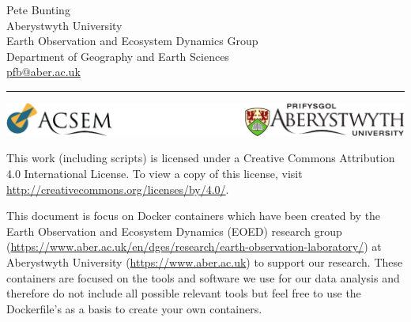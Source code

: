\documentclass[authoryear, 11pt, oneside]{report}
\newcommand{\HRule}[1]{\hfill \rule{0.2\linewidth}{#1}} %
\begin{document}
\vfill %


{\centering \large 
\hfill Pete Bunting \\
\hfill Aberystwyth University \\
\hfill Earth Observation and Ecosystem Dynamics Group \\
\hfill Department of Geography and Earth Sciences \\
\hfill \url{pfb@aber.ac.uk} \\

\HRule{1pt}} %


\begin{center}
	\includegraphics[width=\columnwidth]{./figures/Logos.pdf}
\end{center}

\clearpage %





\begin{framed}
This work (including scripts) is licensed under a Creative Commons Attribution 4.0 International License. To view a copy of this license, visit \url{http://creativecommons.org/licenses/by/4.0/}. 
\end{framed}

\begin{framed}
This document is focus on Docker containers which have been created by the Earth Observation and Ecosystem Dynamics (EOED) research group (\url{https://www.aber.ac.uk/en/dges/research/earth-observation-laboratory/}) at Aberystwyth University (\url{https://www.aber.ac.uk}) to support our research. These containers are focused on the tools and software we use for our data analysis and therefore do not include all possible relevant tools but feel free to use the Dockerfile's as a basis to create your own containers.
\end{framed}
\end{document}

